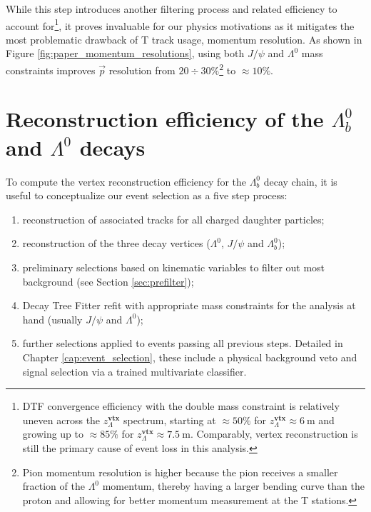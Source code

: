 While this step introduces another filtering process and related efficiency to account for\footnote{DTF convergence efficiency with the double mass constraint is relatively uneven across the $z_\Lambda^\textbf{vtx}$ spectrum, starting at $\approx 50\%$ for $z_\Lambda^\textbf{vtx} \approx \SI{6}{\meter}$ and growing up to $\approx 85\%$ for $z_\Lambda^\textbf{vtx} \approx \SI{7.5}{\meter}$.
Comparably, vertex reconstruction is still the primary cause of event loss in this analysis.}, it proves invaluable for our physics motivations as it mitigates the most problematic drawback of T track usage, momentum resolution.
As shown in Figure \ref{fig:paper_momentum_resolutions}, using both $J/\psi$ and $\Lambda^0$ mass constraints improves $\vec{p}$ resolution from $20 \div 30\%$\footnote{Pion momentum resolution is higher because the pion receives a smaller fraction of the $\Lambda^0$ momentum, thereby having a larger bending curve than the proton and allowing for better momentum measurement at the T stations.} to $\approx 10\%$.


\section{Reconstruction efficiency of the \texorpdfstring{$\Lambda^0_b$}{Lambdab} and \texorpdfstring{$\Lambda^0$}{Lambda} decays}
\label{sec:reco_efficiency}

To compute the vertex reconstruction efficiency for the $\Lambda_b^0$ decay chain, it is useful to conceptualize our event selection as a five step process:
\begin{enumerate}
	\item reconstruction of associated tracks for all charged daughter particles;
	\item reconstruction of the three decay vertices ($\Lambda^0$, $J/\psi$ and $\Lambda_b^0$);
	\item preliminary selections based on kinematic variables to filter out most background (see Section \ref{sec:prefilter});
	\item Decay Tree Fitter refit with appropriate mass constraints for the analysis at hand (usually $J/\psi$ and $\Lambda^0$);
	\item further selections applied to events passing all previous steps. Detailed in Chapter \ref{cap:event_selection}, these include a physical background veto and signal selection via a trained multivariate classifier.
\end{enumerate}

